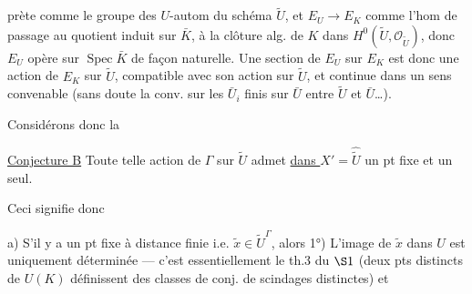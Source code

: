 prète comme le groupe  des $U$-autom du schéma $\widetilde U$, et $E_U\longrightarrow E_K$ comme l'hom de passage au quotient induit sur $\bar K$,  à la clôture alg. de $K$ dans $H^0(\widetilde U,\mathcal O_{\widetilde U})$, donc $E_U$ opère sur $\operatorname{Spec}\bar K$ de façon naturelle. Une section de $E_U$ sur $E_K$ est donc une action de $E_K$ sur $\widetilde U$, compatible avec son action sur $\widetilde U$, et continue dans un sens convenable (sans doute la conv.  sur les  $\bar U_i$ finis sur $\bar U$ entre $\widetilde U$ et $\bar U$\ldots).

Considérons donc la

\uline{Conjecture B} Toute telle action de $\Gamma$ sur $\widetilde U$ admet \uline{dans $X'$}$=\widehat{\widetilde U}$ un pt fixe et un seul.

Ceci signifie donc

a) S'il y a un pt fixe à distance finie i.e. $\widetilde x\in\widetilde U^\Gamma$, alors 1°) L'image de $\widetilde x$ dans $U$ est uniquement déterminée --- c'est essentiellement le th.3 du $\S1$ (deux pts distincts de $U(K)$ définissent des classes de conj. de scindages distinctes) et
